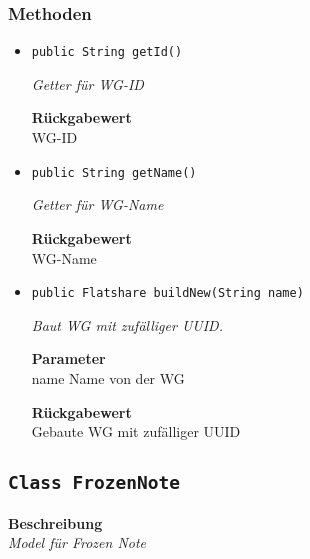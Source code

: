     \subsubsection{Methoden}
    \begin{itemize}
    	\item{\texttt{public String getId()}}
    	
    	\textit{Getter für WG-ID}
    	
    	
    	
    	\textbf{Rückgabewert} \\
    	WG-ID        \item{\texttt{public String getName()}}
    	
    	\textit{Getter für WG-Name}
    	
    	
    	
    	\textbf{Rückgabewert} \\
    	WG-Name        \item{\texttt{public Flatshare buildNew(String name)}}
    	
    	\textit{Baut WG mit zufälliger UUID.}
    	
    	\textbf{Parameter} \\
    	name Name von der WG
    	
    	\textbf{Rückgabewert} \\
    	Gebaute WG mit zufälliger UUID
    \end{itemize}
    \subsection{\texttt{Class FrozenNote}}
    \textbf{Beschreibung} \\
    \textit{Model für Frozen Note}
